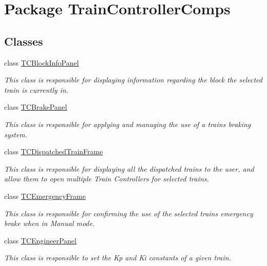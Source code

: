 \hypertarget{namespaceTrainControllerComps}{}\section{Package Train\+Controller\+Comps}
\label{namespaceTrainControllerComps}
\subsection*{Classes}
\begin{DoxyCompactItemize}
\item 
class \hyperlink{classTrainControllerComps_1_1TCBlockInfoPanel}{T\+C\+Block\+Info\+Panel}
\begin{DoxyCompactList}\small\item\em This class is responsible for displaying information regarding the block the selected train is currently in. \end{DoxyCompactList}\item 
class \hyperlink{classTrainControllerComps_1_1TCBrakePanel}{T\+C\+Brake\+Panel}
\begin{DoxyCompactList}\small\item\em This class is responsible for applying and managing the use of a train\textquotesingle{}s braking system. \end{DoxyCompactList}\item 
class \hyperlink{classTrainControllerComps_1_1TCDispatchedTrainFrame}{T\+C\+Dispatched\+Train\+Frame}
\begin{DoxyCompactList}\small\item\em This class is responsible for displaying all the dispatched trains to the user, and allow them to open multiple Train Controllers for selected trains. \end{DoxyCompactList}\item 
class \hyperlink{classTrainControllerComps_1_1TCEmergencyFrame}{T\+C\+Emergency\+Frame}
\begin{DoxyCompactList}\small\item\em This class is responsible for confirming the use of the selected trains emergency brake when in Manual mode. \end{DoxyCompactList}\item 
class \hyperlink{classTrainControllerComps_1_1TCEngineerPanel}{T\+C\+Engineer\+Panel}
\begin{DoxyCompactList}\small\item\em This class is responsible to set the Kp and Ki constants of a given train. \end{DoxyCompactList}\item 

\end{DoxyCompactItemize}
